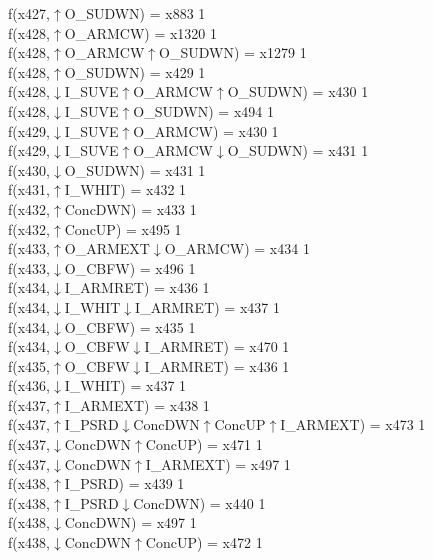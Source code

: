 f(x427,$\uparrow$O\_SUDWN) = x883 {1} \\
f(x428,$\uparrow$O\_ARMCW) = x1320 {1} \\
f(x428,$\uparrow$O\_ARMCW$\uparrow$O\_SUDWN) = x1279 {1} \\
f(x428,$\uparrow$O\_SUDWN) = x429 {1} \\
f(x428,$\downarrow$I\_SUVE$\uparrow$O\_ARMCW$\uparrow$O\_SUDWN) = x430 {1} \\
f(x428,$\downarrow$I\_SUVE$\uparrow$O\_SUDWN) = x494 {1} \\
f(x429,$\downarrow$I\_SUVE$\uparrow$O\_ARMCW) = x430 {1} \\
f(x429,$\downarrow$I\_SUVE$\uparrow$O\_ARMCW$\downarrow$O\_SUDWN) = x431 {1} \\
f(x430,$\downarrow$O\_SUDWN) = x431 {1} \\
f(x431,$\uparrow$I\_WHIT) = x432 {1} \\
f(x432,$\uparrow$ConcDWN) = x433 {1} \\
f(x432,$\uparrow$ConcUP) = x495 {1} \\
f(x433,$\uparrow$O\_ARMEXT$\downarrow$O\_ARMCW) = x434 {1} \\
f(x433,$\downarrow$O\_CBFW) = x496 {1} \\
f(x434,$\downarrow$I\_ARMRET) = x436 {1} \\
f(x434,$\downarrow$I\_WHIT$\downarrow$I\_ARMRET) = x437 {1} \\
f(x434,$\downarrow$O\_CBFW) = x435 {1} \\
f(x434,$\downarrow$O\_CBFW$\downarrow$I\_ARMRET) = x470 {1} \\
f(x435,$\uparrow$O\_CBFW$\downarrow$I\_ARMRET) = x436 {1} \\
f(x436,$\downarrow$I\_WHIT) = x437 {1} \\
f(x437,$\uparrow$I\_ARMEXT) = x438 {1} \\
f(x437,$\uparrow$I\_PSRD$\downarrow$ConcDWN$\uparrow$ConcUP$\uparrow$I\_ARMEXT) = x473 {1} \\
f(x437,$\downarrow$ConcDWN$\uparrow$ConcUP) = x471 {1} \\
f(x437,$\downarrow$ConcDWN$\uparrow$I\_ARMEXT) = x497 {1} \\
f(x438,$\uparrow$I\_PSRD) = x439 {1} \\
f(x438,$\uparrow$I\_PSRD$\downarrow$ConcDWN) = x440 {1} \\
f(x438,$\downarrow$ConcDWN) = x497 {1} \\
f(x438,$\downarrow$ConcDWN$\uparrow$ConcUP) = x472 {1} \\
